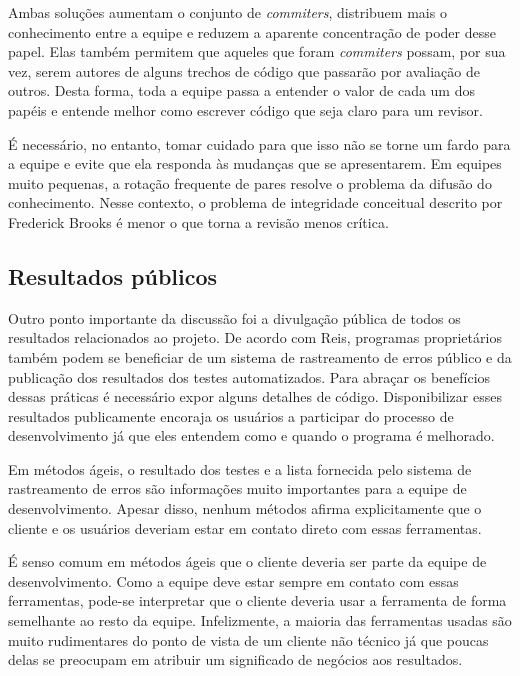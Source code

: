 Ambas soluções aumentam o conjunto de \emph{commiters}, distribuem
mais o conhecimento entre a equipe e reduzem a aparente concentração
de poder desse papel. Elas também permitem que aqueles que foram
\emph{commiters} possam, por sua vez, serem autores de alguns trechos
de código que passarão por avaliação de outros. Desta forma, toda a
equipe passa a entender o valor de cada um dos papéis e entende melhor
como escrever código que seja claro para um revisor.

É necessário, no entanto, tomar cuidado para que isso não se torne um
fardo para a equipe e evite que ela responda às mudanças que se
apresentarem. Em equipes muito pequenas, a rotação frequente de pares
resolve o problema da difusão do conhecimento. Nesse contexto, o
problema de integridade conceitual descrito por Frederick Brooks
\cite{Brooks1975-mmme} é menor o que torna a revisão menos crítica.

\subsection{Resultados públicos}
\label{subsec:publicity}

Outro ponto importante da discussão foi a divulgação pública de todos
os resultados relacionados ao projeto. De acordo com Reis, programas
proprietários também podem se beneficiar de um sistema de rastreamento
de erros público e da publicação dos resultados dos testes
automatizados. Para abraçar os benefícios dessas práticas é necessário
expor alguns detalhes de código. Disponibilizar esses resultados
publicamente encoraja os usuários a participar do processo de
desenvolvimento já que eles entendem como e quando o programa é
melhorado.

Em métodos ágeis, o resultado dos testes e a lista fornecida pelo
sistema de rastreamento de erros são informações muito importantes
para a equipe de desenvolvimento. Apesar disso, nenhum métodos afirma
explicitamente que o cliente e os usuários deveriam estar em contato
direto com essas ferramentas.

É senso comum em métodos ágeis que o cliente deveria ser parte da
equipe de desenvolvimento. Como a equipe deve estar sempre em contato
com essas ferramentas, pode-se interpretar que o cliente deveria usar
a ferramenta de forma semelhante ao resto da equipe. Infelizmente, a
maioria das ferramentas usadas são muito rudimentares do ponto de
vista de um cliente não técnico já que poucas delas se preocupam em
atribuir um significado de negócios aos resultados.

